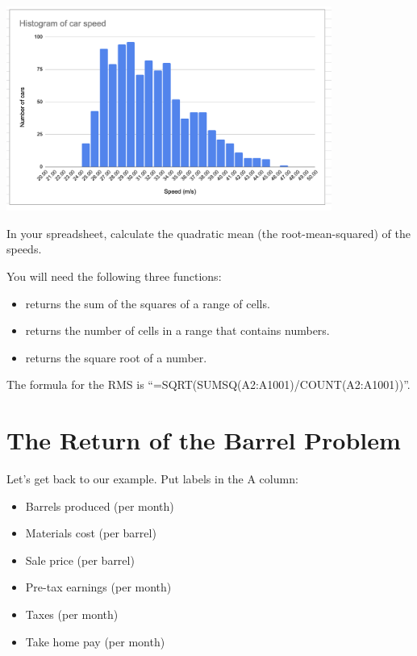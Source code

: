 \includegraphics[width=0.8\textwidth]{final_histogram.png}

\begin{Exercise}[title={RMS}, label=rms_spreadsheet]

  In your spreadsheet, calculate the quadratic mean (the root-mean-squared) of the speeds.

  You will need the following three functions:
  \begin{itemize}
  \item {} returns the sum of the squares of a range of cells.
  \item {} returns the number of cells in a range that contains numbers.
  \item {} returns the square root of a number.
  \end{itemize}


\end{Exercise}
\begin{Answer}[ref=rms_spreadsheet]

The formula for the RMS is ``=SQRT(SUMSQ(A2:A1001)/COUNT(A2:A1001))''.

\end{Answer}


\section{The Return of the Barrel Problem}

Let's get back to our example. Put labels in the A column:
\begin{itemize}
\item{Barrels produced (per month)}
\item{Materials cost (per barrel)}
\item{Sale price (per barrel)}
\item{Pre-tax earnings (per month)}
\item{Taxes (per month)}
\item{Take home pay (per month)}
\end{itemize}

